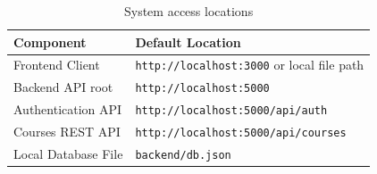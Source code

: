 \documentclass[12pt,a4paper]{report}
\begin{document}
\begin{table}[h!]
\centering
\begin{tabular}{|p{5cm}|p{8cm}|}
\hline
\textbf{Component} & \textbf{Default Location} \\
\hline
Frontend Client & \texttt{http://localhost:3000} or local file path \\
\hline
Backend API root & \texttt{http://localhost:5000} \\
\hline
Authentication API & \texttt{http://localhost:5000/api/auth} \\
\hline
Courses REST API & \texttt{http://localhost:5000/api/courses} \\
\hline
Local Database File & \texttt{backend/db.json} \\
\hline
\end{tabular}
\caption{System access locations}
\label{tab:urls}
\end{table}
\end{document}
